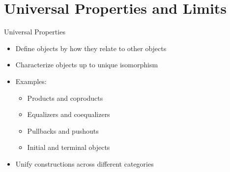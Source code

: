 \documentclass{beamer}
\begin{document}
\section{Universal Properties and Limits}

\begin{frame}{Universal Properties}
    \begin{itemize}
        \item Define objects by how they relate to other objects
        \item Characterize objects up to unique isomorphism
        \item Examples:
            \begin{itemize}
                \item Products and coproducts
                \item Equalizers and coequalizers
                \item Pullbacks and pushouts
                \item Initial and terminal objects
            \end{itemize}
        \item Unify constructions across different categories
    \end{itemize}
\end{frame}
\end{document}

